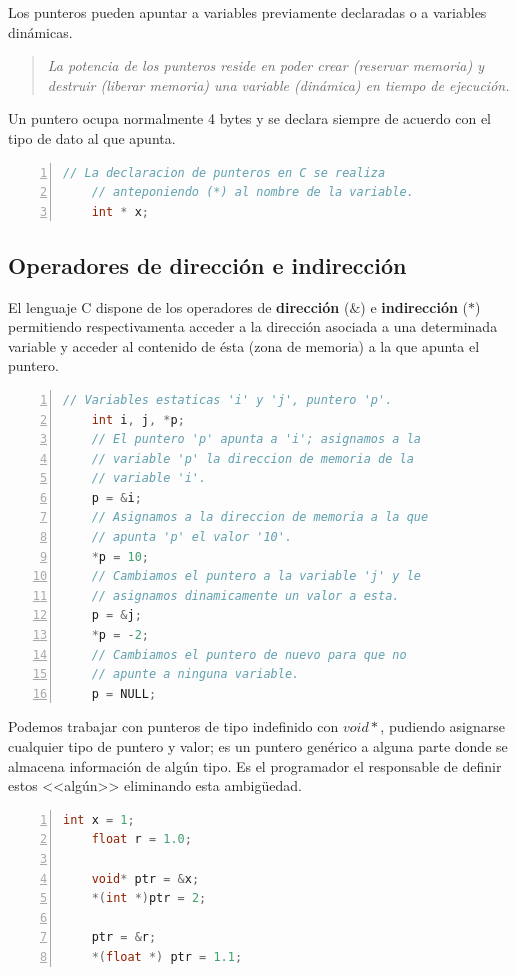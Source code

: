 \documentclass[a4paper, 11pt, titlepage]{article}
\begin{document}
    Los punteros pueden apuntar a variables previamente declaradas o a variables dinámicas.

    \begin{quote}
        \small \textit{La potencia de los punteros reside en poder crear (reservar memoria) y 
        destruir (liberar memoria) una variable (dinámica) en tiempo de ejecución.}
    \end{quote}

    Un puntero ocupa normalmente 4 bytes y se declara siempre de acuerdo con el tipo de dato al que apunta.

    \begin{lstlisting}[language=C,numbers=left]
    // La declaracion de punteros en C se realiza 
    // anteponiendo (*) al nombre de la variable.
    int * x;\end{lstlisting}

    \subsection{Operadores de dirección e indirección}

    El lenguaje C dispone de los operadores de \textbf{dirección} (\textit{$\&$}) e \textbf{indirección} 
    (\textit{$*$}) permitiendo respectivamenta acceder a la dirección asociada a una determinada variable
    y acceder al contenido de ésta (zona de memoria) a la que apunta el puntero.

    \begin{lstlisting}[language=C,numbers=left]
    // Variables estaticas 'i' y 'j', puntero 'p'. 
    int i, j, *p;
    // El puntero 'p' apunta a 'i'; asignamos a la 
    // variable 'p' la direccion de memoria de la 
    // variable 'i'.
    p = &i;
    // Asignamos a la direccion de memoria a la que 
    // apunta 'p' el valor '10'.
    *p = 10;
    // Cambiamos el puntero a la variable 'j' y le 
    // asignamos dinamicamente un valor a esta.
    p = &j;
    *p = -2;
    // Cambiamos el puntero de nuevo para que no 
    // apunte a ninguna variable.
    p = NULL;\end{lstlisting}

    Podemos trabajar con punteros de tipo indefinido con \textit{$void *$}, pudiendo asignarse cualquier
    tipo de puntero y valor; es un puntero genérico a alguna parte donde se almacena información
    de algún tipo. Es el programador el responsable de definir estos <<algún>> eliminando esta 
    ambigüedad.

    \begin{lstlisting}[language=C,numbers=left]
    int x = 1;
    float r = 1.0;

    void* ptr = &x;
    *(int *)ptr = 2;

    ptr = &r;
    *(float *) ptr = 1.1;\end{lstlisting}
\end{document}
